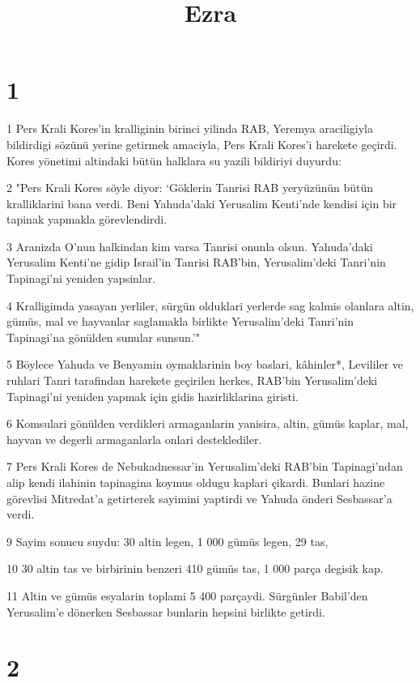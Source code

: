 

\title{Ezra}


\chapter{1}

\par 1 Pers Krali Kores'in kralliginin birinci yilinda RAB, Yeremya araciligiyla bildirdigi sözünü yerine getirmek amaciyla, Pers Krali Kores'i harekete geçirdi. Kores yönetimi altindaki bütün halklara su yazili bildiriyi duyurdu:
\par 2 "Pers Krali Kores söyle diyor: `Göklerin Tanrisi RAB yeryüzünün bütün kralliklarini bana verdi. Beni Yahuda'daki Yerusalim Kenti'nde kendisi için bir tapinak yapmakla görevlendirdi.
\par 3 Aranizda O'nun halkindan kim varsa Tanrisi onunla olsun. Yahuda'daki Yerusalim Kenti'ne gidip Israil'in Tanrisi RAB'bin, Yerusalim'deki Tanri'nin Tapinagi'ni yeniden yapsinlar.
\par 4 Kralligimda yasayan yerliler, sürgün olduklari yerlerde sag kalmis olanlara altin, gümüs, mal ve hayvanlar saglamakla birlikte Yerusalim'deki Tanri'nin Tapinagi'na gönülden sunular sunsun.'"
\par 5 Böylece Yahuda ve Benyamin oymaklarinin boy baslari, kâhinler*, Levililer ve ruhlari Tanri tarafindan harekete geçirilen herkes, RAB'bin Yerusalim'deki Tapinagi'ni yeniden yapmak için gidis hazirliklarina giristi.
\par 6 Komsulari gönülden verdikleri armaganlarin yanisira, altin, gümüs kaplar, mal, hayvan ve degerli armaganlarla onlari desteklediler.
\par 7 Pers Krali Kores de Nebukadnessar'in Yerusalim'deki RAB'bin Tapinagi'ndan alip kendi ilahinin tapinagina koymus oldugu kaplari çikardi. Bunlari hazine görevlisi Mitredat'a getirterek sayimini yaptirdi ve Yahuda önderi Sesbassar'a verdi.
\par 9 Sayim sonucu suydu: 30 altin legen, 1 000 gümüs legen, 29 tas,
\par 10 30 altin tas ve birbirinin benzeri 410 gümüs tas, 1 000 parça degisik kap.
\par 11 Altin ve gümüs esyalarin toplami 5 400 parçaydi. Sürgünler Babil'den Yerusalim'e dönerken Sesbassar bunlarin hepsini birlikte getirdi.

\chapter{2}

